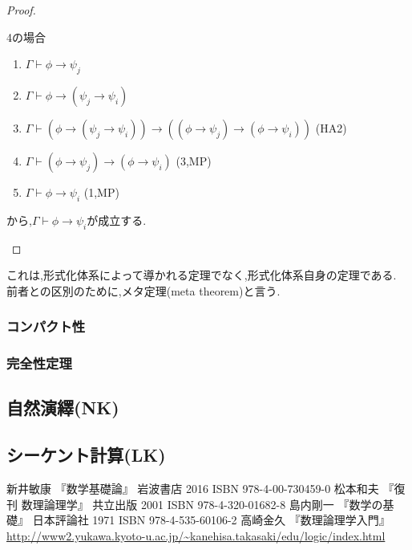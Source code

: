 \begin{proof}
\begin{description}
			 4の場合
			 \renewcommand{\labelenumi}{\arabic{enumi})}
			 \begin{enumerate}
			  \item $\Gamma \vdash \phi \to \psi_j$
			  \item $\Gamma \vdash \phi \to (\psi_j \to \psi_i)$
			  \item $\Gamma \vdash (\phi \to (\psi_j \to \psi_i)) \to ((\phi \to \psi_j) \to (\phi \to \psi_i))$ (HA2)
			  \item $\Gamma \vdash (\phi \to \psi_j) \to (\phi \to \psi_i)$ (3,MP)
			  \item $\Gamma \vdash \phi \to \psi_i$ (1,MP)
			 \end{enumerate}
			 から,$\Gamma \vdash \phi \to \psi_i$が成立する.
 \end{description}
\end{proof}
これは,形式化体系によって導かれる定理でなく,形式化体系自身の定理である.
前者との区別のために,メタ定理(meta theorem)と言う.

\subsubsection{コンパクト性}
\subsubsection{完全性定理}


\subsection{自然演繹(NK)}

\subsection{シーケント計算(LK)}

\begin{thebibliography}{9}
		新井敏康 『数学基礎論』 岩波書店 2016 ISBN 978-4-00-730459-0
		松本和夫 『復刊 数理論理学』 共立出版 2001 ISBN 978-4-320-01682-8
		島内剛一 『数学の基礎』 日本評論社 1971 ISBN 978-4-535-60106-2
		高崎金久 『数理論理学入門』 \url{http://www2.yukawa.kyoto-u.ac.jp/~kanehisa.takasaki/edu/logic/index.html}
\end{thebibliography}
